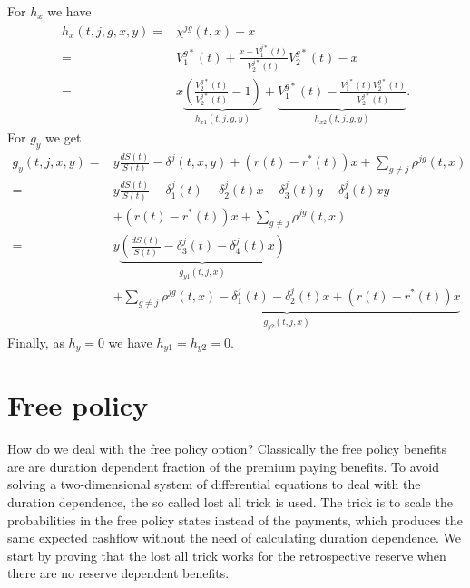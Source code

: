 \documentclass[12pt]{article}
\begin{document}
For $h_x$ we have
\begin{align*}
h_x(t,j,g,x,y)=&\chi^{jg}(t,x) -x
\\
=&
V^{g*}_1(t) + \frac{x-V^{j*}_1(t)}{V^{j*}_2(t)}V^{g*}_2(t) -x
\\
=&
x
\underbrace{\left( \frac{V^{g*}_2(t)}{V^{j*}_2(t)}-1 \right)}_{h_{x1}(t,j,g,y)}+\underbrace{V^{g*}_1(t) - \frac{V^{j*}_1(t)V^{g*}_2(t)}{V^{j*}_2(t)}}_{h_{x2}(t,j,g,y)}.
\end{align*}
For $g_y$ we get
\begin{align*}
g_y(t,j,x,y)=&y \frac{dS(t)}{S(t)} - \delta^j(t,x,y) + (r(t)-r^*(t)) x + \sum_{g \neq j} \rho^{jg}(t,x) 
\\
=&y\frac{dS(t)}{S(t)} - \delta_1^j(t)-\delta_2^j(t)x-\delta_3^j(t)y-\delta_4^j(t)xy
\\
&+ (r(t)-r^*(t)) x
+\sum_{g \neq j} \rho^{jg}(t,x)
\\
=& y \underbrace{\left( \frac{dS(t)}{S(t)}-\delta_3^j(t)-\delta_4^j(t)x\right)
}_{g_{y1}(t,j,x)}\\
& \underbrace{+\sum_{g \neq j} \rho^{jg}(t,x)- \delta_1^j(t)-\delta_2^j(t)x
+ (r(t)-r^*(t)) x }_{g_{y2}(t,j,x)}
\end{align*}
Finally, as $h_y=0$ we have $h_{y1}=h_{y2}=0$.

\section*{Free policy}
How do we deal with the free policy option? Classically the free policy benefits are are duration dependent fraction of the premium paying benefits. To avoid solving a two-dimensional system of differential equations to deal with the duration dependence, the so called lost all trick is used. The trick is to scale the probabilities in the free policy states instead of the payments, which produces the same expected cashflow without the need of calculating duration dependence. We start by proving that the lost all trick works for the retrospective reserve when there are no reserve dependent benefits.
\end{document}
